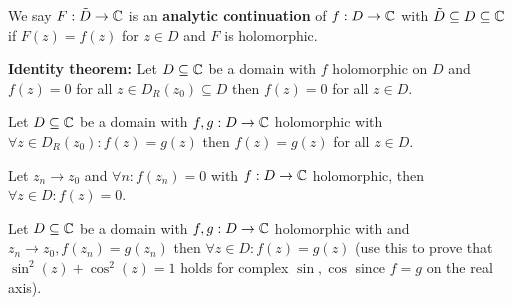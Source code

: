 \begin{multicols}{2}
\begin{definition}
We say $F:\tilde{D}\to\mathbb{C}$ is an \textbf{analytic continuation} of $f:D\to\mathbb{C}$ with $\tilde{D}\subseteq D\subseteq\mathbb{C}$ if $F(z)=f(z)$ for $z\in D$ and $F$ is holomorphic.
\end{definition}

\begin{theorem}[4.6.4]
\textbf{Identity theorem:} Let $D\subseteq\mathbb{C}$ be a domain with $f$ holomorphic on $D$ and $f(z)=0$ for all $z\in D_R(z_0)\subseteq D$ then $f(z)=0$ for all $z\in D$.
\end{theorem}

\begin{theorem}[4.6.5]
Let $D\subseteq\mathbb{C}$ be a domain with $f,g:D\to\mathbb{C}$ holomorphic with $\forall z\in D_R(z_0):f(z)=g(z)$ then $f(z)=g(z)$ for all $z\in D$.
\end{theorem}

\begin{theorem}[4.6.7]
Let $z_n\to z_0$ and $\forall n: f(z_n)=0$ with $f:D\to\mathbb{C}$ holomorphic, then $\forall z\in D:f(z)=0$.
\end{theorem}

\begin{theorem}[4.5.8]
Let $D\subseteq\mathbb{C}$ be a domain with $f,g:D\to\mathbb{C}$ holomorphic with and $z_n\to z_0, f(z_n)=g(z_n)$ then $\forall z\in D: f(z)=g(z)$ (use this to prove that $\sin^2(z) + \cos^2(z)=1$ holds for complex $\sin,\cos$ since $f=g$ on the real axis).
\end{theorem}

\end{multicols}